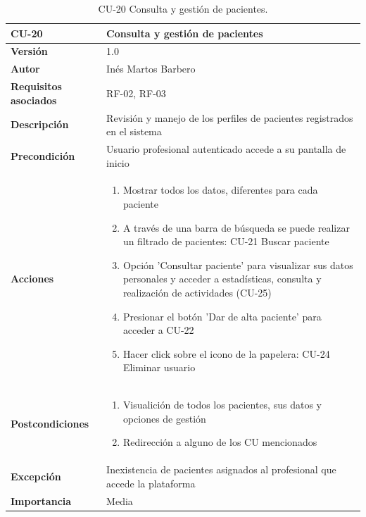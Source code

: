\begin{table}[p]
	\centering
	\begin{tabularx}{\linewidth}{ p{} p{} }
		\toprule
		\textbf{CU-20}    & \textbf{Consulta y gestión de pacientes}\\
		\toprule
		\textbf{Versión}              & 1.0    \\
		\textbf{Autor}                & Inés Martos Barbero \\
		\textbf{Requisitos asociados} & RF-02, RF-03 \\
		\textbf{Descripción}          & Revisión y manejo de los perfiles de pacientes registrados en el sistema \\
		\textbf{Precondición}         & Usuario profesional autenticado accede a su pantalla de inicio \\
		\textbf{Acciones}             &
		\begin{enumerate}
			\def\labelenumi{\arabic{enumi}.}
			\tightlist
			\item Mostrar todos los datos, diferentes para cada paciente
			\item A través de una barra de búsqueda se puede realizar un filtrado de pacientes: CU-21 Buscar paciente
            \item Opción 'Consultar paciente' para visualizar sus datos personales y acceder a estadísticas, consulta y realización de actividades (CU-25)
            \item Presionar el botón 'Dar de alta paciente' para acceder a CU-22
            \item Hacer click sobre el icono de la papelera: CU-24 Eliminar usuario
		\end{enumerate}\\
		\textbf{Postcondiciones}        & 
        \begin{enumerate}
			\def\labelenumi{\arabic{enumi}.}
			\tightlist
			\item Visualición de todos los pacientes, sus datos y opciones de gestión
			\item Redirección a alguno de los CU mencionados
		\end{enumerate}\\
		\textbf{Excepción}          & Inexistencia de pacientes asignados al profesional que accede la plataforma \\
		\textbf{Importancia}          & Media \\
		\bottomrule
	\end{tabularx}
	\caption{CU-20 Consulta y gestión de pacientes.}
\end{table}

